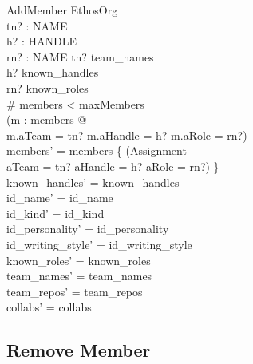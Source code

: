 \documentclass[a4paper,10pt,fleqn]{article}
\begin{document}
\begin{schema}{AddMember}
  \Delta EthosOrg \\
  tn? : NAME \\
  h? : HANDLE \\
  rn? : NAME
\where
  tn? \in team\_names \\
  h? \in known\_handles \\
  rn? \in known\_roles \\
  \# members < maxMembers \\
  \lnot (\exists m : members @ \\
  \quad m.aTeam = tn? \land m.aHandle = h? \land m.aRole = rn?) \\
  members' = members \cup \{ (\mu Assignment | \\
  \quad aTeam = tn? \land aHandle = h? \land aRole = rn?) \} \\
  known\_handles' = known\_handles \\
  id\_name' = id\_name \\
  id\_kind' = id\_kind \\
  id\_personality' = id\_personality \\
  id\_writing\_style' = id\_writing\_style \\
  known\_roles' = known\_roles \\
  team\_names' = team\_names \\
  team\_repos' = team\_repos \\
  collabs' = collabs
\end{schema}

\subsection{Remove Member}
\end{document}
